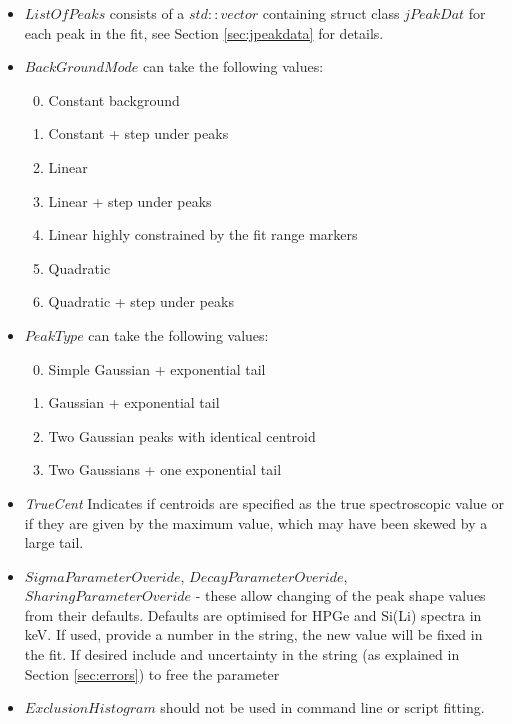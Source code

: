 \documentclass[a4paper,10pt]{article}
\begin{document}
\renewcommand{\labelenumi}{\arabic{enumi}}
\begin{itemize}
	\item $ListOfPeaks$ consists of a $std::vector$ containing struct class $jPeakDat$ for each peak in the fit, see Section \ref{sec:jpeakdata} for details.
	\item $BackGroundMode$ can take the following values:
      \begin{enumerate}
      \setcounter{enumi}{-1}
      \item Constant background
      \item Constant + step under peaks
      \setcounter{enumi}{9}
      \item Linear
      \item Linear + step under peaks
      \item Linear highly constrained by the fit range markers
      \setcounter{enumi}{19}
      \item Quadratic
      \item Quadratic + step under peaks
      \end{enumerate}
    \item $PeakType$ can take the following values:
      \begin{enumerate}
      \setcounter{enumi}{-1}
      \item Simple Gaussian + exponential tail
      \item Gaussian + exponential tail
      \setcounter{enumi}{9}
      \item Two Gaussian peaks with identical centroid 
      \item Two Gaussians + one exponential tail
      \end{enumerate}
    \item \textit{TrueCent} Indicates if centroids are specified as the true spectroscopic value or if they are given by the maximum value, which may have been skewed by a large tail. 
    \item $SigmaParameterOveride$, $DecayParameterOveride$, $SharingParameterOveride$ - these allow changing of the peak shape values from their defaults. Defaults are optimised for HPGe and Si(Li) spectra in keV. If used, provide a number in the string, the new value will be fixed in the fit. If desired include and uncertainty in the string (as explained in Section \ref{sec:errors}) to free the parameter
    \item $ExclusionHistogram$ should not be used in command line or script fitting.   
\end{itemize}
\end{document}
